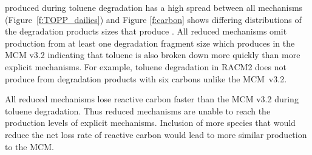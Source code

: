  produced during toluene degradation has a high spread between all mechanisms \mbox{(Figure \ref{f:TOPP_dailies})} and Figure \ref{f:carbon} shows differing distributions of the degradation products sizes that produce .
All reduced mechanisms omit  production from at least one degradation fragment size which produces  in the MCM v3.2 indicating that toluene is also broken down more quickly than more explicit mechanisms.
For example, toluene degradation in RACM2 does not produce  from degradation products with six carbons unlike the \mbox{MCM v3.2}.

All reduced mechanisms lose reactive carbon faster than the MCM v3.2 during toluene degradation.
Thus reduced mechanisms are unable to reach the  production levels of explicit mechanisms.
Inclusion of more species that would reduce the net loss rate of reactive carbon would lead to more similar  production to the MCM.
